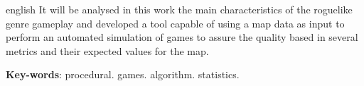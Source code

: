 \begin{resumo}[Abstract]
 \begin{otherlanguage*}{english}
  It will be analysed in this work the main characteristics of the roguelike genre gameplay and developed a tool capable of using a map data as input to perform an automated simulation of games to assure the quality based in several metrics and their expected values  for the map.

 \begin{comment}
   The creation of procedurally generated content in eletronic games over the last few years has been significantly increasing. The games of roguelike genre overstate themselfes as since their creation in the 80's, they have already been heavily using procedural generated maps and itens.
   
   Even though the heavy usage of procedural content, there is not a good metric today to measure in a precise way the quality of their maps. Usually having to adjust their generated maps based on several user tests and the gut feeling obteined after many runs.
   
   There is nothing wrong with the method, although if there was a tool capable of producing good metrics for the randômly generated maps in a realativelly fast way, that could accelarate the improvment of creation algorithms as the overall test time would be reduced. Meaning, you could get more imediate results in a shorter amount of time.
   
   In this project will be developed a system capable of obtaining a map and testing it through a series of metrics to assure que quality of the map in comparisson with a desired quality expected. As part of the second part of the project, a comparasing analysys will be made to state if randomly generated maps can have similar metrics as manual crafted ones and how real users feel about that, assuring the reability of the system in its results. 
\end{comment}
   \vspace{\onelineskip}
 
   \noindent 
   \textbf{Key-words}: procedural. games. algorithm. statistics.
 \end{otherlanguage*}
\end{resumo}
